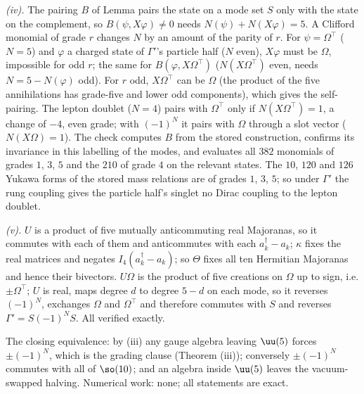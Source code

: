 \emph{(iv).} The pairing $B$ of Lemma  pairs the state on a mode set $S$ only with the state on the complement, so $B(\psi, X\varphi) \ne 0$ needs $N(\psi) + N(X\varphi) = 5$. A Clifford monomial of grade $r$ changes $N$ by an amount of the parity of $r$. For $\psi = \Omega^{\top}$ ($N = 5$) and $\varphi$ a charged state of $\Gamma'$'s particle half ($N$ even), $X\varphi$ must be $\Omega$, impossible for odd $r$; the same for $B(\varphi, X\Omega^{\top})$ ($N(X\Omega^{\top})$ even, needs $N = 5 - N(\varphi)$ odd). For $r$ odd, $X\Omega^{\top}$ can be $\Omega$ (the product of the five annihilations has grade-five and lower odd components), which gives the self-pairing. The lepton doublet ($N = 4$) pairs with $\Omega^{\top}$ only if $N(X\Omega^{\top}) = 1$, a change of $-4$, even grade; with $(-1)^{N}$ it pairs with $\Omega$ through a slot vector ($N(X\Omega) = 1$). The check computes $B$ from the stored construction, confirms its invariance in this labelling of the modes, and evaluates all $382$ monomials of grades $1$, $3$, $5$ and the $210$ of grade $4$ on the relevant states. The $10$, $120$ and $126$ Yukawa forms of the stored mass relations are of grades $1$, $3$, $5$; so under $\Gamma'$ the rung coupling gives the particle half's singlet no Dirac coupling to the lepton doublet.

\emph{(v).} $U$ is a product of five mutually anticommuting real Majoranas, so it commutes with each of them and anticommutes with each $a^{\dagger}_{k} - a_{k}$; $\kappa$ fixes the real matrices and negates $I_{4}(a^{\dagger}_{k} - a_{k})$; so $\Theta$ fixes all ten Hermitian Majoranas and hence their bivectors. $U\Omega$ is the product of five creations on $\Omega$ up to sign, i.e. $\pm\Omega^{\top}$; $U$ is real, maps degree $d$ to degree $5 - d$ on each mode, so it reverses $(-1)^{N}$, exchanges $\Omega$ and $\Omega^{\top}$ and therefore commutes with $S$ and reverses $\Gamma' = S(-1)^{N}S$. All verified exactly.

The closing equivalence: by (iii) any gauge algebra leaving $\uu(5)$ forces $\pm(-1)^{N}$, which is the grading clause (Theorem (iii)); conversely $\pm(-1)^{N}$ commutes with all of $\so(10)$; and an algebra inside $\uu(5)$ leaves the vacuum-swapped halving. Numerical work: none; all statements are exact.
